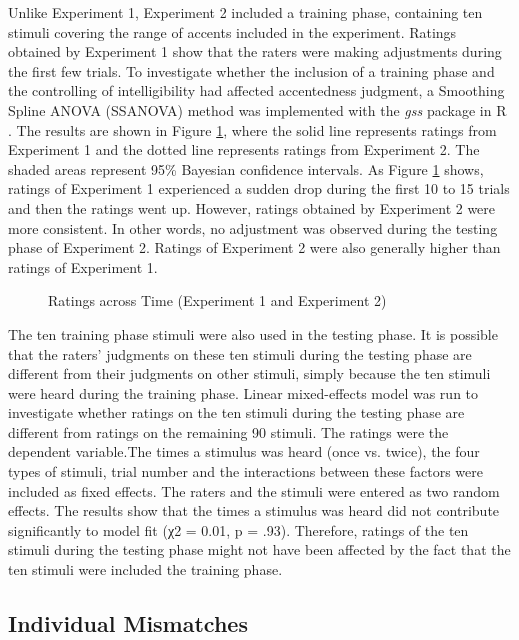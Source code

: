 Unlike Experiment 1, Experiment 2 included a training phase, containing ten stimuli covering the range of accents included in the experiment. Ratings obtained by Experiment 1 show that the raters were making adjustments during the first few trials. To investigate whether the inclusion of a training phase and the controlling of intelligibility had affected accentedness judgment, a Smoothing Spline ANOVA (SSANOVA) method was implemented with the \textit{gss} package in R \citep{Gu_2013}. The results are shown in Figure \ref{fig:tr2}, where the solid line represents ratings from Experiment 1 and the dotted line represents ratings from Experiment 2. The shaded areas represent 95\% Bayesian confidence intervals. As Figure \ref{fig:tr2} shows, ratings of Experiment 1 experienced a sudden drop during the first 10 to 15 trials and then the ratings went up. However, ratings obtained by Experiment 2 were more consistent. In other words, no adjustment was observed during the testing phase of Experiment 2. Ratings of Experiment 2 were also generally higher than ratings of Experiment 1.

\begin{figure}[!h]
  \figSpace
    \centering

    \caption{Ratings across Time (Experiment 1 and Experiment 2)}
    \label{fig:tr2}
  \figSpace
\end{figure}

The ten training phase stimuli were also used in the testing phase.  It is possible that the raters' judgments on these ten stimuli during the testing phase are different from their judgments on other stimuli, simply because the ten stimuli were heard during the training phase. Linear mixed-effects model was run to investigate whether ratings on the ten stimuli during the testing phase are different from ratings on the remaining 90 stimuli. The ratings were the dependent variable.The times a stimulus was heard (once vs. twice), the four types of stimuli, trial number and the interactions between these factors were included as fixed effects. The raters and the stimuli were entered as two random effects. The results show that the times a stimulus was heard did not contribute significantly to model fit (χ2 = 0.01, p = .93). Therefore, ratings of the ten stimuli during the testing phase might not have been affected by the fact that the ten stimuli were included the training phase.


\subsection{Individual Mismatches}

